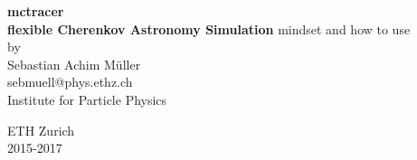 \documentclass[11pt,a4paper,oneside,titlepage]{book}
\begin{document}
\newcommand{\CppFileStartEnd}[3]{%
    \begin{footnotesize}
    \end{footnotesize}
}

\newcommand{\TxtFile}[1]{%
    \begin{footnotesize}
    \end{footnotesize}
}

\newcommand{\ill}[1]{%
    \begin{lstlisting}#1\end{lstlisting}    
}

\newcommand{\CenFig}[2]{
    \begin{figure}[H]
        \begin{center}
            \texttt{[image: \#1]}
        \end{center}
    \end{figure}
}

\makeatletter
{}
\def\lst@SkipToFirst{%
    \lst@ifmatchrangestart\c@lstnumber=\numexpr-1+\lst@firstline\fi
    \ifnum \lst@lineno<\lst@firstline
        \def\lst@next{\lst@BeginDropInput\lst@Pmode
        \lst@Let{13}\lst@MSkipToFirst
        \lst@Let{10}\lst@MSkipToFirst}%
        \expandafter\lst@next
    \else
        \expandafter\lst@BOLGobble
    \fi}
\makeatother
\newcommand{\thetitle}{mctracer\\flexible Cherenkov Astronomy Simulation}
%
\thispagestyle{empty}
\begin{center}
\Huge\textbf{\thetitle}
%
\vfill
%
\Large
mindset and how to use\\
\vspace{20pt}
\normalsize
{by\\\Large Sebastian Achim M\"uller } \\[5pt]
%
{\normalsize sebmuell@phys.ethz.ch}\\
%
\vspace{20pt}
Institute for Particle Physics
\par\smallskip\noindent
ETH Zurich\\2015-2017
\end{center}
\tableofcontents
\cleardoublepage
%
\setcounter{page}{0}
%
\end{document}
